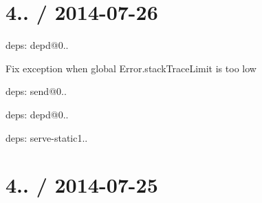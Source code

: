 \section*{4.. / 2014-\/07-\/26 }


\begin{DoxyItemize}
\item deps\+: depd@0..
\begin{DoxyItemize}
\item Fix exception when global {\ttfamily Error.\+stack\+Trace\+Limit} is too low
\end{DoxyItemize}
\item deps\+: send@0..
\begin{DoxyItemize}
\item deps\+: depd@0..
\end{DoxyItemize}
\item deps\+: serve-\/static1..
\end{DoxyItemize}

\section*{4.. / 2014-\/07-\/25 }


